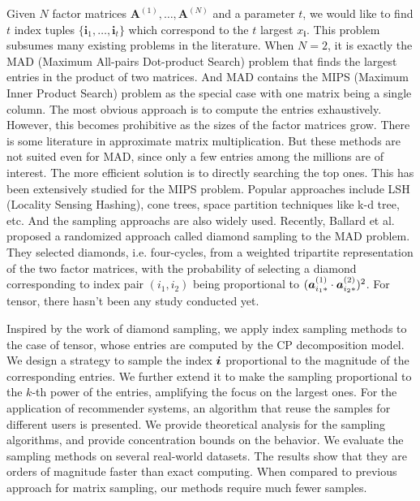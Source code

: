 \documentclass[letterpaper]{article}
\newcommand{\V}[1]{{\boldsymbol{{\MakeLowercase{#1}}}}}
\newcommand{\RowVecA}[1]{\V{a}^{(#1)}_{i_#1*}}
\begin{document}
Given $N$ factor matrices $\textbf{A}^{(1)},\ldots,\textbf{A}^{(N)}$ and a parameter $t$, 
we would like to find $t$ index tuples $\{\boldsymbol{i}_1,\ldots,\boldsymbol{i}_t\}$ 
which correspond to the $t$ largest $x_{\boldsymbol{i}}$.
This problem subsumes many existing problems in the literature.
When $N=2$, it is exactly the MAD (Maximum All-pairs Dot-product Search) problem 
that finds the largest entries in the product of two matrices. 
And MAD contains the MIPS (Maximum Inner Product Search)\cite{Cohen97} problem 
as the special case with one matrix being a single column.
The most obvious approach is to compute the entries exhaustively. 
However, this becomes prohibitive as the sizes of the factor matrices grow. 
There is some literature in approximate matrix multiplication. 
But these methods are not suited even for MAD, 
since only a few entries among the millions are of interest. 
The more efficient solution is to directly searching the top ones. 
This has been extensively studied for the MIPS problem.
Popular approaches include LSH (Locality Sensing Hashing)\cite{Andoni08,ALSH14},
cone trees\cite{Ram12},
space partition techniques like k-d tree, etc.
And the sampling approachs are also widely used\cite{Drineas2006,John15}.
Recently, Ballard et al. proposed a randomized approach called diamond sampling\cite{BaPiKoSe15} to the MAD problem. 
They selected diamonds, i.e. four-cycles, from a weighted tripartite representation of the two factor matrices, 
with the probability of selecting a diamond corresponding to index pair $(i_1,i_2)$ being proportional to $(\RowVecA{1}\cdot\RowVecA{2})^2$.
For tensor, there hasn't been any study conducted yet.

Inspired by the work of diamond sampling,
we apply index sampling methods to the case of tensor, 
whose entries are computed by the CP decomposition model. 
We design a strategy to sample the index $\V{i}$ proportional to the magnitude of the corresponding entries. 
We further extend it to make the sampling proportional to the $k$-th power of the entries,
amplifying the focus on the largest ones. 
For the application of recommender systems, 
an algorithm that reuse the samples for different users is presented. 
We provide theoretical analysis for the sampling algorithms, 
and provide concentration bounds on the behavior. 
We evaluate the sampling methods on several real-world datasets. 
The results show that they are orders of magnitude faster than exact computing. 
When compared to previous approach for matrix sampling, our methods require much fewer samples.
\end{document}
